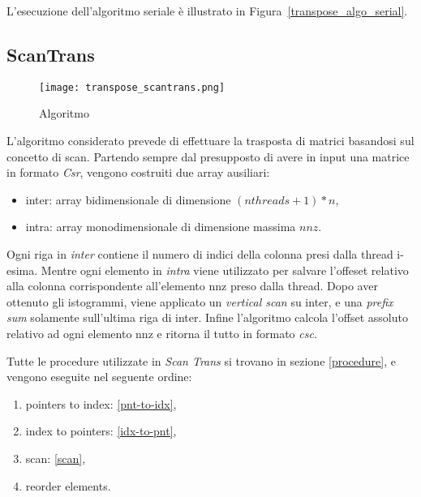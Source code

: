 L'esecuzione dell'algoritmo seriale è illustrato in Figura~\ref{transpose_algo_serial}.

\subsection{ScanTrans}

\begin{figure}[htbp]
    \centering
	\texttt{[image: transpose\_scantrans.png]}
	\caption{Algoritmo \ScanTrans}
	\label{transpose_algo_scantrans}
\end{figure}


L'algoritmo considerato prevede di effettuare la trasposta di matrici basandosi sul concetto di scan. Partendo sempre dal presupposto di avere in input una matrice in formato \textit{Csr}, vengono costruiti due array ausiliari:
\begin{itemize}
	\item inter: array bidimensionale di dimensione $ (nthreads+1) * n $,
	\item intra: array monodimensionale di dimensione massima $ nnz $.
\end{itemize}
Ogni riga in \textit{inter} contiene il numero di indici della colonna presi dalla thread i-esima. Mentre ogni elemento in \textit{intra} viene utilizzato per salvare l'offeset relativo alla colonna corrispondente all'elemento nnz preso dalla thread. Dopo aver ottenuto gli istogrammi, viene applicato un \textit{vertical scan} su inter, e una \textit{prefix sum} solamente sull'ultima riga di inter. Infine l'algoritmo calcola l'offset assoluto relativo ad ogni elemento nnz e ritorna il tutto in formato \textit{csc}.

Tutte le procedure utilizzate in \textit{Scan Trans} si trovano in sezione \ref{procedure}, e vengono eseguite nel seguente ordine:
\begin{enumerate}
	\item pointers to index: \ref{pnt-to-idx},
	\item index to pointers: \ref{idx-to-pnt},
	\item scan: \ref{scan},
	\item reorder elements.
\end{enumerate}


